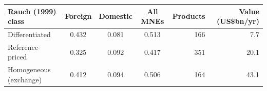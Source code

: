 \begin{tabular}{lcccrr}
\toprule
Rauch (1999) class & Foreign & Domestic & All MNEs & Products & Value (US\$bn/yr) \\
\midrule
Differentiated & 0.432 & 0.081 & 0.513 & 166 & 7.7 \\
Reference-priced & 0.325 & 0.092 & 0.417 & 351 & 20.1 \\
Homogeneous (exchange) & 0.412 & 0.094 & 0.506 & 164 & 43.1 \\
\bottomrule
\end{tabular}
